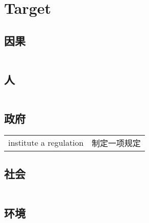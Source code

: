 \section{Target}

\subsection{因果}

\begin{tabular}{ll}
\end{tabular}

\subsection{人}

\begin{tabular}{ll}
\end{tabular}

\subsection{政府}

\begin{tabular}{ll}
    institute a regulation & 制定一项规定 \\
\end{tabular}

\subsection{社会}

\begin{tabular}{ll}
\end{tabular}

\subsection{环境}

\begin{tabular}{ll}
\end{tabular}